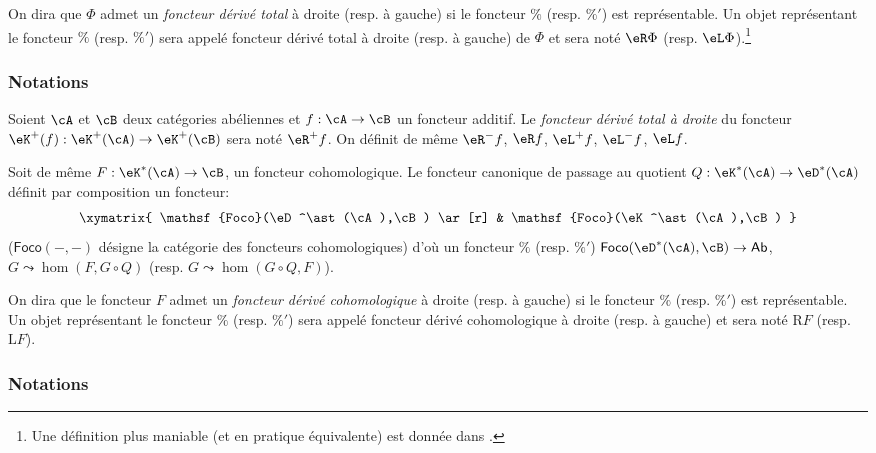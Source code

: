 \begin{definition}\label{VIII:4-1-2}
On dira que $\Phi$ admet un \emph{foncteur dérivé total} à droite (resp. 
à gauche) si le foncteur $\%$ (resp. $\%'$) est représentable. Un objet 
représentant le foncteur $\%$ (resp. $\%'$) sera appelé foncteur dérivé 
total à droite (resp. à gauche) de $\Phi$ et sera noté 
$\eR \Phi$ (resp. $\eL \Phi$).\footnote{Une définition plus maniable (et en 
pratique équivalente) est donnée dans .}
\end{definition}





\subsubsection{Notations}\label{VIII:4-1-3}

Soient $\cA$ et $\cB$ deux catégories abéliennes et $f:\cA\to \cB$ un 
foncteur additif. Le \emph{foncteur dérivé total à droite} du foncteur 
$\eK^+(f):\eK^+(\cA) \to \eK^+(\cB)$ sera noté $\eR^+ f$. On définit de 
même $\eR^- f$, $\eR f$, $\eL^+ f$, $\eL^- f$, $\eL f$. 

Soit de même $F:\eK^\ast(\cA) \to \cB$, un foncteur cohomologique. Le 
foncteur canonique de passage au quotient $Q:\eK^\ast(\cA) \to \eD^\ast(\cA)$ 
définit par composition un foncteur: 
\[\xymatrix{
  \mathsf{Foco}(\eD^\ast(\cA),\cB) \ar[r] 
    & \mathsf{Foco}(\eK^\ast(\cA),\cB) 
}\]
($\mathsf{Foco}(-,-)$ désigne la catégorie des foncteurs cohomologiques) 
d'où un foncteur $\%$ (resp. $\%'$) 
$\mathsf{Foco}(\eD^\ast(\cA),\cB) \to \mathsf{Ab}$, $G\leadsto \hom(F,G\circ Q)$ 
(resp. $G\leadsto \hom(G\circ Q,F)$). 





\begin{definition}\label{VIII:4-1-4}
On dira que le foncteur $F$ admet un \emph{foncteur dérivé cohomologique} 
à droite (resp. à gauche) si le foncteur $\%$ (resp. $\%'$) est 
représentable. Un objet représentant le foncteur $\%$ (resp. $\%'$) sera 
appelé foncteur dérivé cohomologique à droite (resp. à gauche) et 
sera noté $\mathrm{R} F$ (resp. $\mathrm{L} F$). 
\end{definition}





\subsubsection{Notations}\label{VIII:4-1-5}

